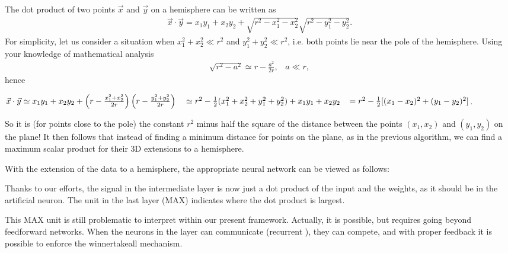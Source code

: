 \documentclass[letterpaper,10pt,english]{jupyterBook}
\begin{document}
\sphinxAtStartPar
The dot product of two points \( \vec {x} \) and \( \vec {y} \) on a hemisphere can be written as
\begin{equation*}
\begin{split} \vec {x} \cdot \vec {y} = x_1 y_1 + x_2 y_2 + \sqrt {r ^ 2-x_1 ^ 2-x_2 ^ 2} \sqrt {r ^ 2-y_1 ^ 2-y_2 ^ 2}. \end{split}
\end{equation*}
\sphinxAtStartPar
For simplicity, let us consider a situation when \( x_1 ^ 2 + x_2 ^ 2 \ll r ^ 2 \) and \( y_1 ^ 2 + y_2 ^ 2 \ll r ^ 2 \), i.e. both points lie near the pole of the hemisphere. Using your knowledge of mathematical analysis
\begin{equation*}
\begin{split} \sqrt{r^2-a^2} \simeq r - \frac{a^2}{2r},  \;\;\;a \ll r, \end{split}
\end{equation*}
\sphinxAtStartPar
hence

\sphinxAtStartPar
\(\vec{x} \cdot \vec{y} \simeq x_1 y_1 + x_2 y_2 + \left( r -\frac{x_1^2+x_2^2}{2r} \right) \left( r -\frac{y_1^2+y_2^2}{2r} \right) \\ 
\;\;\;\simeq r^2 - \frac{1}{2} (x_1^2+x_2^2 +y_1^2+y_2^2) + x_1 y_1+x_2 y_2 \\ 
\;\;\; = r^2 - \frac{1}{2}[ (x_1-x_2)^2 +(y_1-y_2)^2]\).

\sphinxAtStartPar
So it is (for points close to the pole) the constant \( r ^ 2 \) minus half the square of the distance between the points \( (x_1, x_2) \) and \( (y_1, y_2) \) on the plane! It then follows that instead of finding a minimum distance for points on the plane, as in the previous algorithm, we can find a maximum scalar product for their 3D extensions to a hemisphere.

\sphinxAtStartPar
With the extension of the data to a hemisphere, the appropriate neural network can be viewed as follows:

\noindent{}

\sphinxAtStartPar
Thanks to our efforts, the signal in the intermediate layer is now just a dot product of the input and the weights, as it should be in the artificial neuron. The unit in the last layer (MAX) indicates where the dot product is largest.

\sphinxAtStartPar
This MAX unit is still problematic to interpret within our present framework. Actually, it is possible, but requires going beyond feed\sphinxhyphen{}forward networks. When the neurons in the layer can communicate (recurrent ), they can compete, and with proper feed\sphinxhyphen{}back it is possible to enforce the winner\sphinxhyphen{}take\sphinxhyphen{}all mechanism.
\end{document}
